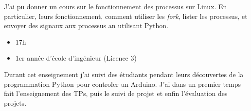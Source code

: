 \documentclass[10pt,a4paper,ragged2e,withhyper]{altacv}
\begin{document}
J'ai pu donner un cours sur le fonctionnement des processus sur Linux.
En particulier, leurs fonctionnement, comment utiliser les \textit{fork}, lister les processus, et envoyer des signaux aux processus an utilisant Python.

\divider

\begin{itemize}
  \item \faClock 17h
  \item 1er année d'école d'ingénieur (Licence 3)
\end{itemize}

Durant cet enseignement j'ai suivi des étudiants pendant leurs découvertes de la programmation Python pour controler un Arduino.
J'ai dans un premier temps fait l'enseignement des TPs, puis le suivi de projet et enfin l'évaluation des projets.



\divider



\divider


\divider







\divider


\medskip
\end{document}
